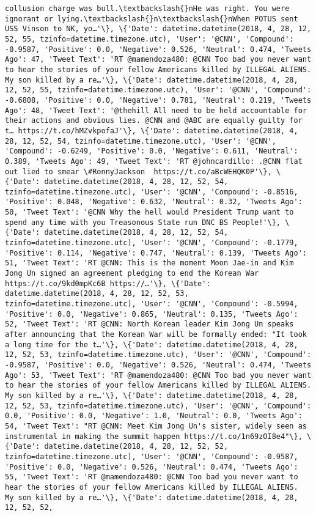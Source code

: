 \documentclass[11pt]{article}
\begin{document}
\begin{Verbatim}[commandchars=\\\{\}]
collusion charge was bull.\textbackslash{}nHe was right. You were ignorant or lying.\textbackslash{}n\textbackslash{}nWhen POTUS sent USS Vinson to NK, yo…'\}, \{'Date': datetime.datetime(2018, 4, 28, 12, 52, 55, tzinfo=datetime.timezone.utc), 'User': '@CNN', 'Compound': -0.9587, 'Positive': 0.0, 'Negative': 0.526, 'Neutral': 0.474, 'Tweets Ago': 47, 'Tweet Text': 'RT @mamendoza480: @CNN Too bad you never want to hear the stories of your fellow Americans killed by ILLEGAL ALIENS.  My son killed by a re…'\}, \{'Date': datetime.datetime(2018, 4, 28, 12, 52, 55, tzinfo=datetime.timezone.utc), 'User': '@CNN', 'Compound': -0.6808, 'Positive': 0.0, 'Negative': 0.781, 'Neutral': 0.219, 'Tweets Ago': 48, 'Tweet Text': '@thehill All need to be held accountable for their actions and obvious lies. @CNN and @ABC are equally guilty for t… https://t.co/hMZvkpofaJ'\}, \{'Date': datetime.datetime(2018, 4, 28, 12, 52, 54, tzinfo=datetime.timezone.utc), 'User': '@CNN', 'Compound': -0.6249, 'Positive': 0.0, 'Negative': 0.611, 'Neutral': 0.389, 'Tweets Ago': 49, 'Tweet Text': 'RT @johncardillo: .@CNN flat out lied to smear \#RonnyJackson  https://t.co/aBcWEHQK0P'\}, \{'Date': datetime.datetime(2018, 4, 28, 12, 52, 54, tzinfo=datetime.timezone.utc), 'User': '@CNN', 'Compound': -0.8516, 'Positive': 0.048, 'Negative': 0.632, 'Neutral': 0.32, 'Tweets Ago': 50, 'Tweet Text': '@CNN Why the hell would President Trump want to spend any time with you Treasonous State run DNC BS People!'\}, \{'Date': datetime.datetime(2018, 4, 28, 12, 52, 54, tzinfo=datetime.timezone.utc), 'User': '@CNN', 'Compound': -0.1779, 'Positive': 0.114, 'Negative': 0.747, 'Neutral': 0.139, 'Tweets Ago': 51, 'Tweet Text': 'RT @CNN: This is the moment Moon Jae-in and Kim Jong Un signed an agreement pledging to end the Korean War https://t.co/9kd0mpKc6B https://…'\}, \{'Date': datetime.datetime(2018, 4, 28, 12, 52, 53, tzinfo=datetime.timezone.utc), 'User': '@CNN', 'Compound': -0.5994, 'Positive': 0.0, 'Negative': 0.865, 'Neutral': 0.135, 'Tweets Ago': 52, 'Tweet Text': 'RT @CNN: North Korean leader Kim Jong Un speaks after announcing that the Korean War will be formally ended: "It took a long time for the t…'\}, \{'Date': datetime.datetime(2018, 4, 28, 12, 52, 53, tzinfo=datetime.timezone.utc), 'User': '@CNN', 'Compound': -0.9587, 'Positive': 0.0, 'Negative': 0.526, 'Neutral': 0.474, 'Tweets Ago': 53, 'Tweet Text': 'RT @mamendoza480: @CNN Too bad you never want to hear the stories of your fellow Americans killed by ILLEGAL ALIENS.  My son killed by a re…'\}, \{'Date': datetime.datetime(2018, 4, 28, 12, 52, 53, tzinfo=datetime.timezone.utc), 'User': '@CNN', 'Compound': 0.0, 'Positive': 0.0, 'Negative': 1.0, 'Neutral': 0.0, 'Tweets Ago': 54, 'Tweet Text': "RT @CNN: Meet Kim Jong Un's sister, widely seen as instrumental in making the summit happen https://t.co/1n69zOI8e4"\}, \{'Date': datetime.datetime(2018, 4, 28, 12, 52, 52, tzinfo=datetime.timezone.utc), 'User': '@CNN', 'Compound': -0.9587, 'Positive': 0.0, 'Negative': 0.526, 'Neutral': 0.474, 'Tweets Ago': 55, 'Tweet Text': 'RT @mamendoza480: @CNN Too bad you never want to hear the stories of your fellow Americans killed by ILLEGAL ALIENS.  My son killed by a re…'\}, \{'Date': datetime.datetime(2018, 4, 28, 12, 52, 52, 
\end{Verbatim}
\end{document}
